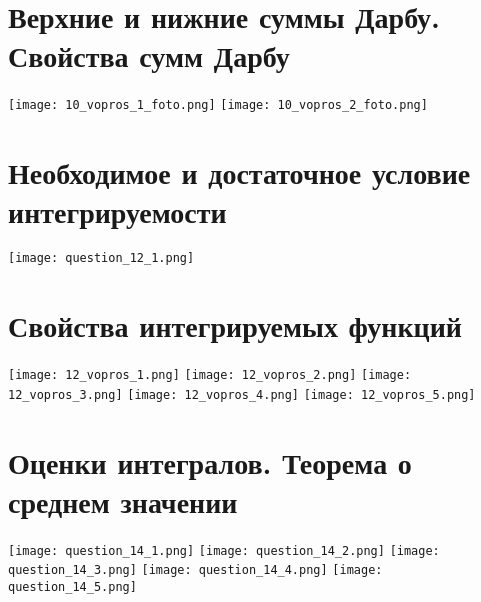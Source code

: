 \documentclass[a4paper,12pt]{article}
\begin{document}
\section{Верхние и нижние суммы Дарбу. Свойства сумм Дарбу}
\texttt{[image: 10\_vopros\_1\_foto.png]}
\texttt{[image: 10\_vopros\_2\_foto.png]}

\section{Необходимое и достаточное условие интегрируемости}
\texttt{[image: question\_12\_1.png]}

\section{Свойства интегрируемых функций}
\texttt{[image: 12\_vopros\_1.png]}
\texttt{[image: 12\_vopros\_2.png]}
\texttt{[image: 12\_vopros\_3.png]}
\texttt{[image: 12\_vopros\_4.png]}
\texttt{[image: 12\_vopros\_5.png]}

\section{Оценки интегралов. Теорема о среднем значении}
\texttt{[image: question\_14\_1.png]}
\texttt{[image: question\_14\_2.png]}
\texttt{[image: question\_14\_3.png]}
\texttt{[image: question\_14\_4.png]}
\texttt{[image: question\_14\_5.png]}
\end{document}
